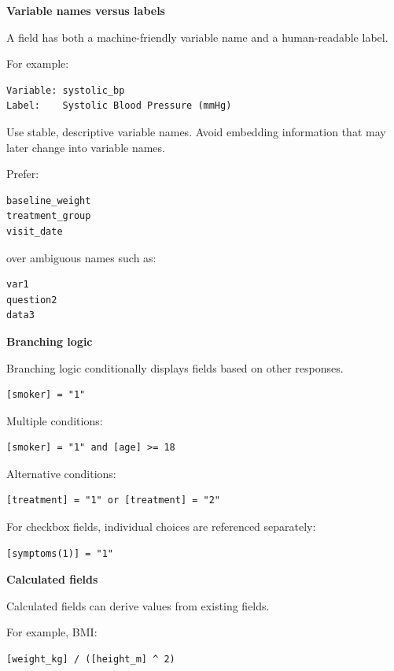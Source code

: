 \documentclass[11pt,letterpaper]{article}
\begin{document}
\textbf{Variable names versus labels}

A field has both a machine-friendly variable name and a human-readable label.

For example:

\begin{lstlisting}
Variable: systolic_bp
Label:    Systolic Blood Pressure (mmHg)
\end{lstlisting}

Use stable, descriptive variable names. Avoid embedding information that may
later change into variable names.

Prefer:

\begin{lstlisting}
baseline_weight
treatment_group
visit_date
\end{lstlisting}

over ambiguous names such as:

\begin{lstlisting}
var1
question2
data3
\end{lstlisting}

\textbf{Branching logic}

Branching logic conditionally displays fields based on other responses.

\begin{lstlisting}
[smoker] = "1"
\end{lstlisting}

Multiple conditions:

\begin{lstlisting}
[smoker] = "1" and [age] >= 18
\end{lstlisting}

Alternative conditions:

\begin{lstlisting}
[treatment] = "1" or [treatment] = "2"
\end{lstlisting}

For checkbox fields, individual choices are referenced separately:

\begin{lstlisting}
[symptoms(1)] = "1"
\end{lstlisting}

\textbf{Calculated fields}

Calculated fields can derive values from existing fields.

For example, BMI:

\begin{lstlisting}
[weight_kg] / ([height_m] ^ 2)
\end{lstlisting}
\end{document}
